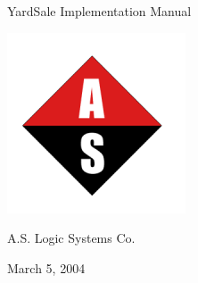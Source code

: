 \documentclass{report}
\begin{document}
\begin{titlepage}
\vspace*{3cm}
\begin{center}

\LARGE{ YardSale Implementation Manual\\ }


\includegraphics{aslogic_smaller.png}

\large{A.S. Logic Systems Co.\\}

\vspace*{0.5cm}

{March 5, 2004}
\end{center}
\end{titlepage}
\end{document}
